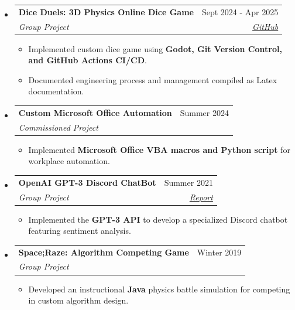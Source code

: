 \documentclass[a4paper,11pt]{article}
\makeatletter
\newcommand{\headingFour}[4]{
	\item
	\begin{tabular*}{0.97\textwidth}{l@{\extracolsep{\fill}}r}
	\textbf{\large\textcolor{customBlue}{#1}} & {#2} \\
	\textit{#3} & \textit{#4} \\
	\end{tabular*}\vspace{-6pt}
}
\makeatother
\begin{document}
\begin{itemize}[leftmargin=*]
\headingFour{Dice Duels: 3D Physics Online Dice Game}{Sept 2024 - Apr 2025}
{Group Project}{\href{https://github.com/John-Popovici/duel-of-the-eights}{GitHub}}
\begin{itemize}
	\item{Implemented custom dice game using \textbf{Godot, Git Version Control, and GitHub Actions CI/CD}.}\vspace{-2pt}
	\item{Documented engineering process and management compiled as Latex documentation.}\vspace{-2pt}
\end{itemize}

\headingFour{Custom Microsoft Office Automation}{Summer 2024}
{Commissioned Project}{~}
\begin{itemize}
	\item{Implemented \textbf{Microsoft Office VBA macros and Python script} for workplace automation.}\vspace{-2pt}
\end{itemize}

\headingFour{OpenAI GPT-3 Discord ChatBot}{Summer 2021}
{Group Project}{\href{https://john-popovici.github.io/files/1Z03_FeelingBot_Report.pdf}{Report}}
\begin{itemize}
	\item{Implemented the \textbf{GPT-3 API} to develop a specialized Discord chatbot featuring sentiment analysis.}\vspace{-2pt}
\end{itemize}

\headingFour{Space;Raze: Algorithm Competing Game}{Winter 2019}
{Group Project}{~}
\begin{itemize}
	\item{Developed an instructional \textbf{Java} physics battle simulation for competing in custom algorithm design.}\vspace{-2pt}
\end{itemize}

\end{itemize}

\end{document}
